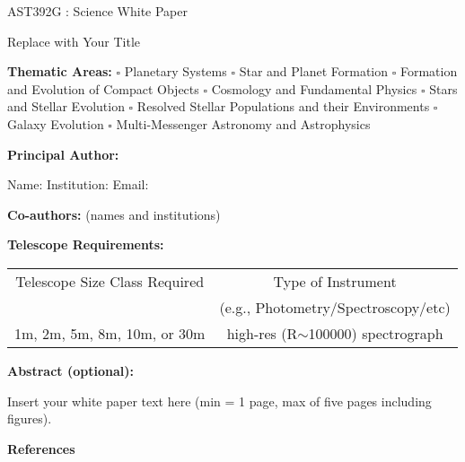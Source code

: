 \documentclass[12pt]{article}
\begin{document}
\raggedright
\huge
AST392G : Science White Paper \linebreak

Replace with Your Title \linebreak
\normalsize

\noindent \textbf{Thematic Areas:} \hspace*{60pt} $\square$ Planetary Systems \hspace*{10pt} $\square$ Star and Planet Formation \hspace*{20pt}\linebreak
$\square$ Formation and Evolution of Compact Objects \hspace*{31pt} $\square$ Cosmology and Fundamental Physics \linebreak
  $\square$  Stars and Stellar Evolution \hspace*{1pt} $\square$ Resolved Stellar Populations and their Environments \hspace*{40pt} \linebreak
  $\square$    Galaxy Evolution   \hspace*{45pt} $\square$             Multi-Messenger Astronomy and Astrophysics \hspace*{65pt} \linebreak
  
\textbf{Principal Author:}

Name:	
 \linebreak						
Institution:  
 \linebreak
Email: 
 \linebreak
 
\textbf{Co-authors:} (names and institutions)
  \linebreak

\textbf{Telescope Requirements:} 
\begin{center}
\begin{tabular}{||c | c ||} 
 \hline
 Telescope Size Class Required  & Type of Instrument\\ 
 & (e.g., Photometry/Spectroscopy/etc)\\ [0.5ex] 
 \hline\hline
 1m, 2m, 5m, 8m, 10m, or 30m  & high-res (R$\sim$100000) spectrograph\\

 \hline
\end{tabular}
\end{center}

\textbf{Abstract  (optional):}


\pagebreak
Insert your white paper text here (min = 1 page, max of five pages including figures).

\pagebreak
\textbf{References}
\end{document}
